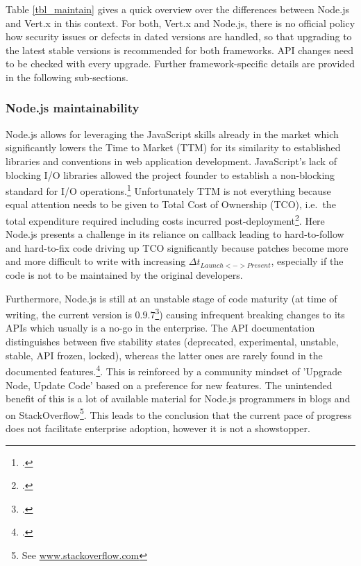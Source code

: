 Table \ref{tbl_maintain} gives a quick overview over the differences between
Node.js and Vert.x in this context. For both, Vert.x and Node.js, there is no
official policy how security issues or defects in dated versions are handled, so
that upgrading to the latest stable versions is recommended for both frameworks.
API changes need to be checked with every upgrade.
Further framework-specific details are provided in the following sub-sections.\\


\subsubsection{Node.js maintainability}

Node.js allows for leveraging the JavaScript skills already in the market which
significantly lowers the Time to Market (TTM)
for its similarity to established libraries and conventions in web application
development. JavaScript's lack of blocking I/O libraries allowed the project
founder to establish a non-blocking standard for I/O operations.\footcite[Cf.][]{Croucher_2012}
Unfortunately TTM is not everything because equal attention needs
to be given to Total Cost of Ownership (TCO), i.e.\ the total expenditure required including costs incurred
post-deployment\footcite[Cf.][203-207]{holtsnider_2010}. 
Here Node.js presents a challenge in its reliance on callback
leading to hard-to-follow and hard-to-fix code driving up TCO significantly
because patches become more and more difficult to write with increasing $\Delta
t_{Launch<->Present}$, especially if the code is not to be maintained by the %
original developers.

Furthermore, Node.js is still at an unstable stage of code maturity (at time of
writing, the current version is $0.9.7$\footcite[Cf.][]{node_unstable_2013})
causing infrequent breaking changes to its APIs which usually is a no-go in the enterprise.
The API documentation distinguishes between five stability states (deprecated,
experimental, unstable, stable, API frozen, locked), whereas the latter ones are
rarely found in the documented features.\footcite[Cf.][] {node_2012}.
This is reinforced by a community mindset of 'Upgrade Node, Update Code' based
on a preference for new features. The unintended benefit of this is a lot of
available material for Node.js programmers in blogs and on
StackOverflow\footnote{See \url{www.stackoverflow.com}}.
This leads to the conclusion that the current pace of progress does not
facilitate enterprise adoption, however it is not a showstopper.

